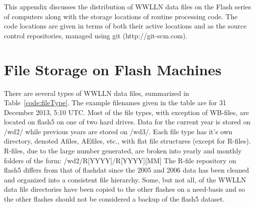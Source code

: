 This appendix discusses the distribution of WWLLN data files on the Flash series of computers along with the storage locations of routine processing code.
The code locations are given in terms of both their active locations and as the source control repositories, managed using git (http://git-scm.com).

\section{File Storage on Flash Machines}

There are several types of WWLLN data files, summarized in Table~\ref{code:fileType}.
The example filenames given in the table are for 31 December 2013, 5:10 UTC.
Most of the file types, with exception of WB-files, are located on flash5 on one of two hard drives.
Data for the current year is stored on /wd2/ while previous years are stored on /wd3/.
Each file type has it's own directory, denoted Afiles, AEfiles, etc., with flat file structures (except for R-files).
R-files, due to the large number generated, are broken into yearly and monthly folders of the form: /wd2/R[YYYY]/R[YYYY][MM]
The R-file repository on flash5 differs from that of flashdat since the 2005 and 2006 data has been cleaned and organized into a consistent file hierarchy.
Some, but not all, of the WWLLN data file directories have been copied to the other flashes on a need-basis and so the other flashes should not be considered a backup of the flash5 dataset.

